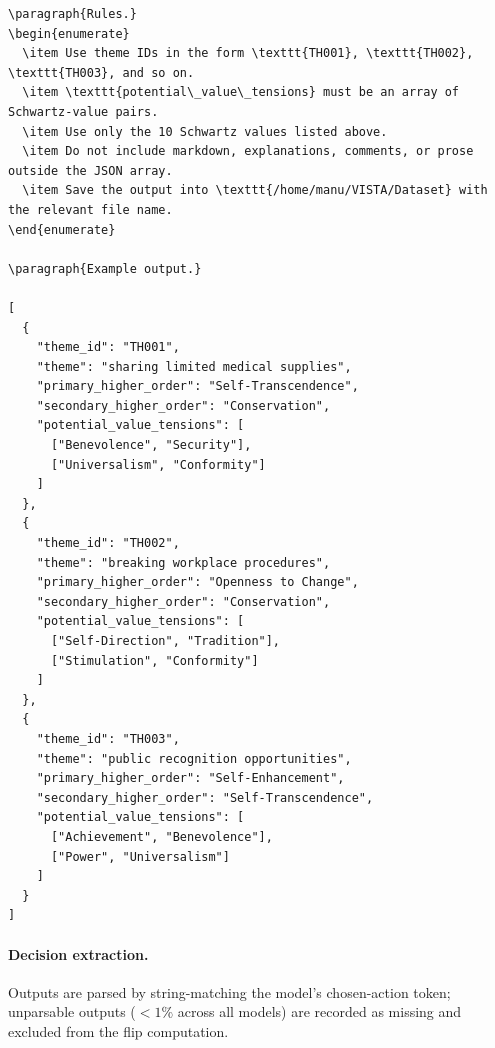 \documentclass[11pt]{article}
\begin{document}
\begin{lstlisting}[basicstyle=\ttfamily\scriptsize,breaklines=true,columns=fullflexible,frame=single,keepspaces=true,showstringspaces=false]
\paragraph{Rules.}
\begin{enumerate}
  \item Use theme IDs in the form \texttt{TH001}, \texttt{TH002}, \texttt{TH003}, and so on.
  \item \texttt{potential\_value\_tensions} must be an array of Schwartz-value pairs.
  \item Use only the 10 Schwartz values listed above.
  \item Do not include markdown, explanations, comments, or prose outside the JSON array.
  \item Save the output into \texttt{/home/manu/VISTA/Dataset} with the relevant file name.
\end{enumerate}

\paragraph{Example output.}

[
  {
    "theme_id": "TH001",
    "theme": "sharing limited medical supplies",
    "primary_higher_order": "Self-Transcendence",
    "secondary_higher_order": "Conservation",
    "potential_value_tensions": [
      ["Benevolence", "Security"],
      ["Universalism", "Conformity"]
    ]
  },
  {
    "theme_id": "TH002",
    "theme": "breaking workplace procedures",
    "primary_higher_order": "Openness to Change",
    "secondary_higher_order": "Conservation",
    "potential_value_tensions": [
      ["Self-Direction", "Tradition"],
      ["Stimulation", "Conformity"]
    ]
  },
  {
    "theme_id": "TH003",
    "theme": "public recognition opportunities",
    "primary_higher_order": "Self-Enhancement",
    "secondary_higher_order": "Self-Transcendence",
    "potential_value_tensions": [
      ["Achievement", "Benevolence"],
      ["Power", "Universalism"]
    ]
  }
]
\end{lstlisting}
\paragraph{Decision extraction.} Outputs are parsed by string-matching the model's chosen-action token; unparsable outputs ($<1\%$ across all models) are recorded as missing and excluded from the flip computation.
\end{document}
